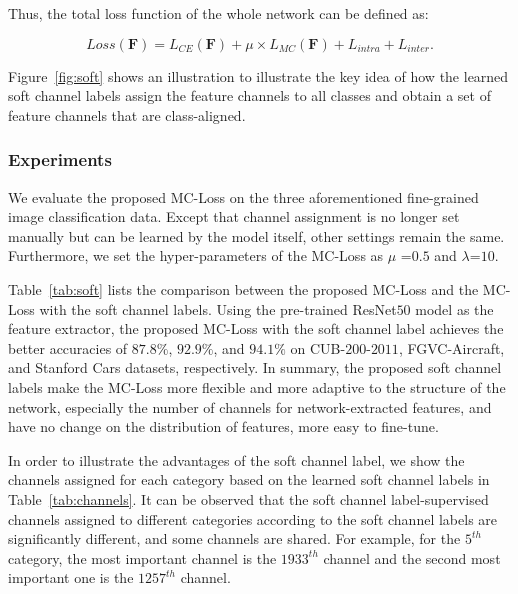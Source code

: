 \documentclass[journal]{IEEEtran}
\begin{document}
Thus, the total loss function of the whole network can be defined as:

\begin{small}
\begin{equation}
  Loss(\mathbf{F})=L_{CE}(\mathbf{F})+\mu\times L_{MC}(\mathbf{F})+L_{intra} + L_{inter}.
 \label{total_loss}
\end{equation}
\end{small}

Figure~\ref{fig:soft} shows an illustration to illustrate the key idea of how the learned soft channel labels assign the feature channels to all classes and obtain a set of feature channels that are class-aligned.



\subsubsection{Experiments}\label{softExperiment}
We evaluate the proposed MC-Loss on the three aforementioned fine-grained  image classification data. Except that channel assignment is no longer set manually but can be learned by the model itself, other settings remain the same. Furthermore, we set the hyper-parameters of the MC-Loss as $\mu$ =$0.5$ and $\lambda$=$10$.




Table~\ref{tab:soft} lists the comparison between the proposed MC-Loss and the MC-Loss with the soft channel labels. Using the pre-trained ResNet$50$ model as the feature extractor, the proposed MC-Loss with the soft channel label achieves the better accuracies of $87.8\%$, $92.9\%$, and $94.1\%$ on CUB-$200$-$2011$, FGVC-Aircraft, and Stanford Cars datasets, respectively. In summary, the proposed soft channel labels make the MC-Loss more  flexible and more adaptive to the structure of the network, especially the number of channels for network-extracted features, and have no change on the distribution of features, more easy to fine-tune.


In order to illustrate the advantages of the soft channel label, we show  the channels assigned  for each category based on the learned soft channel labels in Table~\ref{tab:channels}. It can be observed that the soft channel label-supervised channels assigned  to different categories according to the soft channel labels are significantly different, and some channels are shared. 
For example, for the $5^{th}$ category, the most important channel is the $1933^{th}$ channel and the second most important one is the $1257^{th}$ channel.
\end{document}
